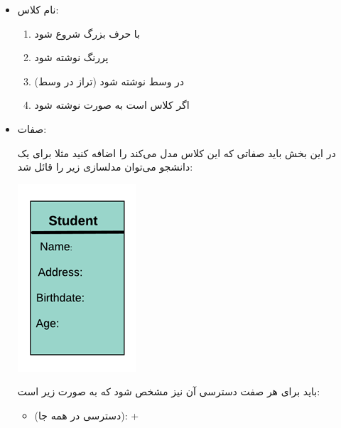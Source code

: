 \documentclass[]{article}
\begin{document}
\begin{itemize}[label=\textcolor{listColor}{$\blacklozenge$}]
  \item
   {\fehrest \textcolor{listColor}{نام کلاس:}}
   
   \begin{enumerate}

\item
   با حرف بزرگ شروع شود
   
\item
پررنگ نوشته شود

\item
در وسط نوشته شود (تراز در وسط)

\item
اگر کلاس  است به صورت \textit{} نوشته شود

   
   
   
   \end{enumerate}
  
  \newpage
  
  \item
   {\fehrest \textcolor{listColor}{صفات: }}
   
   
   در این بخش باید صفاتی که این کلاس مدل می‌کند را اضافه کنید مثلا برای یک دانشجو می‌توان مدلسازی زیر را قائل شد:
   
   
  \begin{center}

\includegraphics[]{images/image15.png}

\end{center}

باید برای هر صفت دسترسی آن نیز مشخص شود که به صورت زیر است:

\begin{itemize}[label={\textbullet}]

\item
{} (دسترسی در همه جا):    +


\end{itemize}
\end{itemize}
\end{document}
